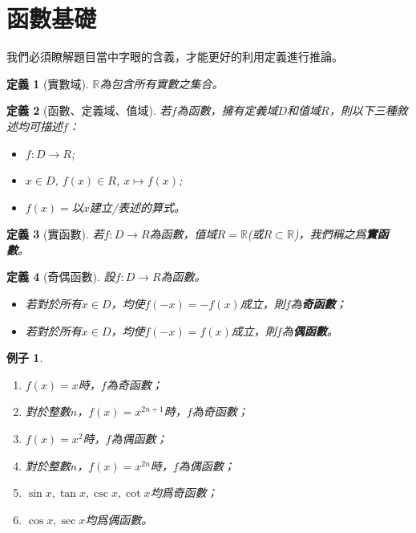 \documentclass[12pt]{article}
\newtheorem*{definition}{定義}
\newtheorem*{example}{例子}
\begin{document}
    \section*{函數基礎}

    我們必須瞭解題目當中字眼的含義，才能更好的利用定義進行推論。

    \begin{definition}[實數域]
        $\mathbb{R}$為包含所有實數之集合。
    \end{definition}

    \begin{definition}[函數、定義域、值域]
        若$f$為函數，擁有定義域$D$和值域$R$，則以下三種敘述均可描述$f$：\begin{itemize}
            \item $f:D\to R$;
            \item $x\in D$, $f(x)\in R$, $x\mapsto f(x)$;
            \item $f(x)=$以$x$建立/表述的算式。
        \end{itemize}
    \end{definition}

    \begin{definition}[實函數]
        若$f:D\to R$為函數，值域$R=\mathbb{R}$(或$R\subset \mathbb{R}$)，我們稱之爲\textbf{實函數}。
    \end{definition}

    \begin{definition}[奇偶函數]
        設$f:D\to R$為函數。\begin{itemize}
            \item 若對於所有$x\in D$，均使$f(-x)=-f(x)$成立，則$f$為\textbf{奇函數}；
            \item 若對於所有$x\in D$，均使$f(-x)=f(x)$成立，則$f$為\textbf{偶函數}。
        \end{itemize}
    \end{definition}

    \begin{example}
        \begin{enumerate}
            \item $f(x)=x$時，$f$為奇函數；
            \item 對於整數$n$，$f(x)=x^{2n+1}$時，$f$為奇函數；
            \item $f(x)=x^2$時，$f$為偶函數；
            \item 對於整數$n$，$f(x)=x^{2n}$時，$f$為偶函數；
            \item $\sin{x},\tan{x},\csc{x},\cot{x}$均爲奇函數；
            \item $\cos{x},\sec{x}$均爲偶函數。
        \end{enumerate}
    \end{example}
\end{document}

